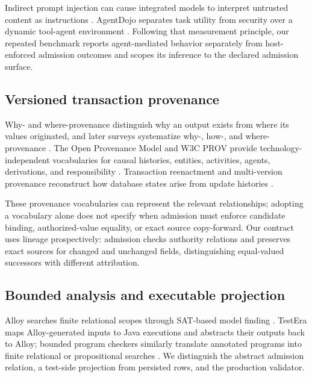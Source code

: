 Indirect prompt injection can cause integrated models to interpret untrusted content as instructions \citep{greshake2023indirect}. AgentDojo separates task utility from security over a dynamic tool-agent environment \citep{debenedetti2024agentdojo}. Following that measurement principle, our repeated benchmark reports agent-mediated behavior separately from host-enforced admission outcomes and scopes its inference to the declared admission surface.

\subsection{Versioned transaction provenance}

Why- and where-provenance distinguish why an output exists from where its values originated, and later surveys systematize why-, how-, and where-provenance \citep{buneman2001whywhere,cheney2009provenance}. The Open Provenance Model and W3C PROV provide technology-independent vocabularies for causal histories, entities, activities, agents, derivations, and responsibility \citep{moreau2011opm,moreau2013provdm}. Transaction reenactment and multi-version provenance reconstruct how database states arise from update histories \citep{arab2016rcsi,arab2018reenactment,arab2019thesis}.

These provenance vocabularies can represent the relevant relationships; adopting a vocabulary alone does not specify when admission must enforce candidate binding, authorized-value equality, or exact source copy-forward. Our contract uses lineage prospectively: admission checks authority relations and preserves exact sources for changed and unchanged fields, distinguishing equal-valued successors with different attribution.

\subsection{Bounded analysis and executable projection}

Alloy searches finite relational scopes through SAT-based model finding \citep{jackson2002alloy,torlak2007kodkod}. TestEra maps Alloy-generated inputs to Java executions and abstracts their outputs back to Alloy; bounded program checkers similarly translate annotated programs into finite relational or propositional searches \citep{marinov2001testera,dennis2006sat,galeotti2013taco}. We distinguish the abstract admission relation, a test-side projection from persisted rows, and the production validator.

